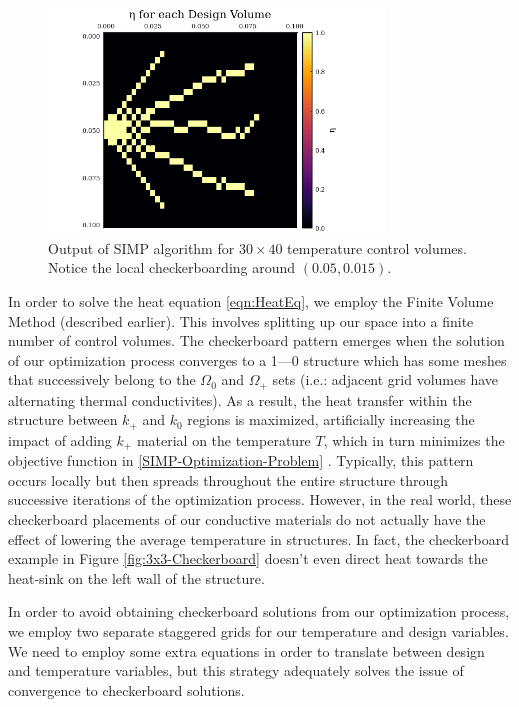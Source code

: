 \begin{figure}
	\centering
	\includegraphics[width=0.8\textwidth]{Chapter_II_SIMP_Optimization/Images/SIMP-Example-Checkerboarding.png}
	\caption[Checkerboard Result in Practice]{Output of SIMP algorithm for $30\times 40$ temperature control volumes. Notice the local checkerboarding around $(0.05,0.015)$.}
	\label{fig:SIMP-Checkerboard}
\end{figure}

In order to solve the heat equation \eqref{eqn:HeatEq}, we employ the Finite Volume Method (described earlier). This involves splitting up our space into a finite number of control volumes. The checkerboard pattern emerges when the solution of our optimization process converges to a 1---0 structure which has some meshes that successively belong to the $\Omega_0$ and $\Omega_+$ sets (i.e.: adjacent grid volumes have alternating thermal conductivites). As a result, the heat transfer within the structure between $k_+$ and $k_0$ regions is maximized, artificially increasing the impact of adding $k_+$ material on the temperature $T$, which in turn minimizes the objective function in \eqref{SIMP-Optimization-Problem} \cite{Versteeg2007}. Typically, this pattern occurs locally but then spreads throughout the entire structure through successive iterations of the optimization process. However, in the real world, these checkerboard placements of our conductive materials do not actually have the effect of lowering the average temperature in structures. In fact, the checkerboard example in Figure \ref{fig:3x3-Checkerboard} doesn't even direct heat towards the heat-sink on the left wall of the structure.

In order to avoid obtaining checkerboard solutions from our optimization process, we employ two separate staggered grids for our temperature and design variables. We need to employ some extra equations in order to translate between design and temperature variables, but this strategy adequately solves the issue of convergence to checkerboard solutions.

